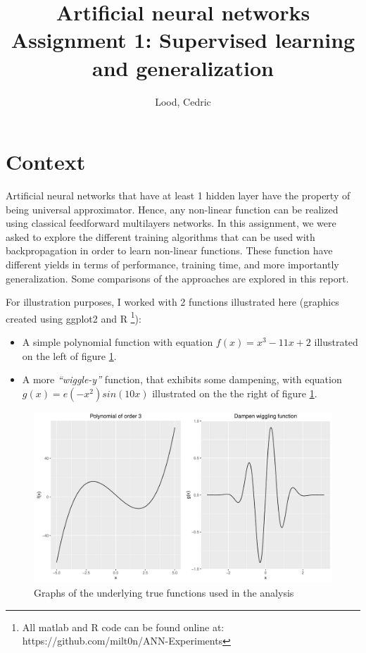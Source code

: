 \documentclass[11pt, a4paper]{article}
\title{ \huge Artificial neural networks \\ 
  { \large Assignment 1: Supervised learning and generalization }}
\author{
        Lood, Cedric
}
\begin{document}
\maketitle

\section{Context}

Artificial neural networks that have at least 1 hidden layer have the
property of being universal
approximator\cite{hornik1989multilayer,leshno1993multilayer}. Hence,
any non-linear function can be realized using classical feedforward
multilayers networks. In this assignment, we were asked to explore the
different training algorithms that can be used with backpropagation in
order to learn non-linear functions. These function have different
yields in terms of performance, training time, and more importantly
generalization. Some comparisons of the approaches are explored in
this report.

\noindent For illustration purposes, I worked with 2 functions
illustrated here (graphics created using ggplot2 and R \footnote{All
  matlab and R code can be found online at:
  https://github.com/milt0n/ANN-Experiments}):

\begin{itemize}
\item A simple polynomial function with equation $f(x)=x^3-11x+2$
  illustrated on the left of figure \ref{fig:functions}.
\item A more \emph{``wiggle-y''} function, that exhibits some
  dampening, with equation $g(x)=e(-x^2)sin(10x)$ illustrated on the
  the right of figure \ref{fig:functions}.
\end{itemize}

\begin{figure}[H]
    \centering
    \includegraphics[scale=.65]{true_functions.pdf}
    \caption{Graphs of the underlying true functions used in the analysis}
    \label{fig:functions}
\end{figure}
\end{document}
